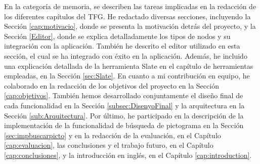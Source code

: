 En la categoría de memoria, se describen las tareas implicadas en la redacción de los diferentes capítulos del TFG. He redactado diversas secciones, incluyendo la Sección \ref{cap:motivacio}, donde se presenta la motivación detrás del proyecto, y la Sección \ref{Editor}, donde se explica detalladamente los tipos de nodos y su integración con la aplicación. También he descrito el editor utilizado en esta sección, el cual se ha integrado con éxito en la aplicación. Además, he incluido una explicación detallada de la herramienta Slate en el capítulo de herramientas empleadas, en la Sección \ref{sec:Slate}. En cuanto a mi contribución en equipo, he colaborado en la redacción de los objetivos del proyecto en la Sección \ref{cap:objetivos}. También hemos desarrollado conjuntamente el diseño final de cada funcionalidad en la Sección \ref{subsec:DisenyoFinal} y la arquitectura en la Sección \ref{sub:Arquitectura}. Por último, he participado en la descripción de la implementación de la funcionalidad de búsqueda de pictograma en la Sección \ref{sec:impbuscarpicto} y en la redacción de la evaluación, en el Capítulo \ref{cap:evaluacion}, las conclusiones y el trabajo futuro, en el Capítulo \ref{cap:conclusiones}, y la introducción en inglés, en el Capítulo \ref{cap:introduction}.

